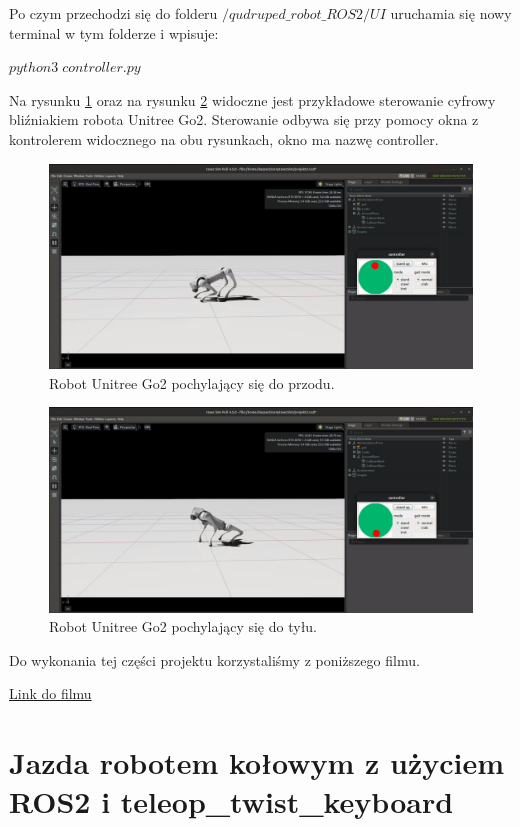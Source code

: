 \documentclass[12pt]{article}
\begin{document}
Po czym przechodzi się do folderu $/qudruped\_robot\_ROS2/UI$ uruchamia się nowy terminal w tym folderze i wpisuje:

$python3\; controller.py$

 
Na rysunku \ref{fig:pochyleniePrzod} oraz na rysunku \ref{fig:pochylenieTyl} widoczne jest przykładowe sterowanie cyfrowy bliźniakiem robota Unitree Go2. Sterowanie odbywa się przy pomocy okna z kontrolerem widocznego na obu rysunkach, okno ma nazwę controller.



\begin{figure}[h]
    \centering
    \includegraphics[width=0.8\linewidth]{Zdjęcia/pochyleniePrzod.png}
    \caption{Robot Unitree Go2 pochylający się do przodu.}
    \label{fig:pochyleniePrzod}
\end{figure}

\begin{figure}[h]
    \centering
    \includegraphics[width=0.8\linewidth]{Zdjęcia/pochylenieTyl.png}
    \caption{Robot Unitree Go2 pochylający się do tyłu.}
    \label{fig:pochylenieTyl}
\end{figure}

Do wykonania tej części projektu korzystaliśmy z poniższego filmu.

\href{https://www.youtube.com/watch?v=L1rpxRm0Q1w&t=581s}{Link do filmu}

\clearpage

\section{Jazda robotem kołowym z użyciem ROS2 i teleop\_twist\_keyboard}
\end{document}
